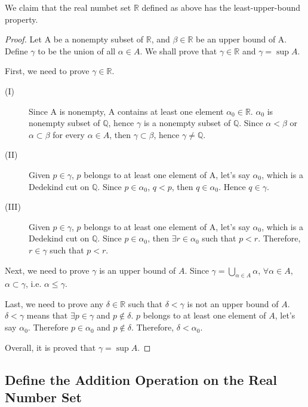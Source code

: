 \documentclass{article}
\begin{document}
We claim that the real numbet set $\mathbb{R}$ defined as above has the 
least-upper-bound property.
\begin{proof}
  Let A be a nonempty subset of $\mathbb{R}$, and $\beta \in \mathbb{R}$ be an 
  upper bound of A. Define $\gamma$ to be the union of all $\alpha \in A$. We 
  shall prove that $\gamma \in \mathbb{R}$ and $\gamma = \sup A$.

  First, we need to prove $\gamma \in \mathbb{R}$.
  \begin{description}
    \item[(I)] Since A is nonempty, A contains at least one element 
    $\alpha_0 \in \mathbb{R}$. $\alpha_0$ is nonempty subset of $\mathbb{Q}$, 
    hence $\gamma$ is a nonempty subset of $\mathbb{Q}$. Since $\alpha < \beta$ 
    or $\alpha \subset \beta$ for every $\alpha \in A$, then 
    $\gamma \subset \beta$, hence $\gamma \neq \mathbb{Q}$.
    \item[(II)] Given $p \in \gamma$, $p$ belongs to at least one element of A, 
    let's say $\alpha_0$, which is a Dedekind cut on $\mathbb{Q}$. Since 
    $p \in \alpha_0$, $q < p$, then $q \in \alpha_0$. Hence $q \in \gamma$.
    \item[(III)] Given $p \in \gamma$, $p$ belongs to at least one element of A, 
    let's say $\alpha_0$, which is a Dedekind cut on $\mathbb{Q}$. Since 
    $p \in \alpha_0$, then $\exists r \in \alpha_0$ such that $p < r$. Therefore,
    $r \in \gamma$ such that $p < r$.
  \end{description}

  Next, we need to prove $\gamma$ is an upper bound of $A$. Since 
  $\gamma = \bigcup_{\alpha \in A} \alpha$, $\forall \alpha \in A$, 
  $\alpha \subset \gamma$, i.e. $\alpha \leq \gamma$.

  Last, we need to prove any $\delta \in \mathbb{R}$ such that $\delta < \gamma$ 
  is not an upper bound of $A$. $\delta < \gamma$ means that 
  $\exists p \in \gamma$ and $p \notin \delta$. $p$ belongs to at least one 
  element of $A$, let's say $\alpha_0$. Therefore $p \in \alpha_0$ and 
  $p \notin \delta$. Therefore, $\delta < \alpha_0$.

  Overall, it is proved that $\gamma = \sup A$.
\end{proof}

\subsection{Define the Addition Operation on the Real Number Set}
\end{document}
